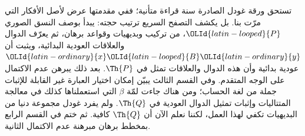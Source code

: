 \documentclass[../../../include/open-logic-section]{subfiles}
\begin{document}


تستحق ورقة غودل الصادرة سنة  قراءة متأنية؛ ففي مقدمتها عرض
لأصل الأفكار التي مرّت بنا. بل يكشف التصفح السريع ترتيب حجته:
يبدأ بوصف النسق الصوري ${\OLId{latin-looped}{P}}$، من تركيب وبديهيات وقواعد برهان،
ثم يعرّف الدوال والعلاقات العودية البدائية، ويثبت أن ${\OLId{latin-ordinary}{x}} {\OLId{latin-looped}{B}} {\OLId{latin-ordinary}{y}}$
عودية بدائية وأن هذه الدوال والعلاقات تمثل في $\Th{P}$.
بعد ذلك يبرهن عدم الاكتمال على الوجه المتقدم. وفي القسم الثالث
يبيّن إمكان اختيار العبارة غير القابلة للإثبات جملة من لغة الحساب؛
ومن هناك جاءت لمّة $\beta$ التي استعملناها كذلك في معالجة
المتتاليات وإثبات تمثيل الدوال العودية في $\Th{Q}$.
ولم يفرد غودل مجموعة دنيا من البديهيات تكفي لهذا العمل، لكننا
نعلم الآن أن $\Th{Q}$ كافية. ثم ختم في القسم الرابع بمخطط
برهان مبرهنة عدم الاكتمال الثانية.
\end{document}

